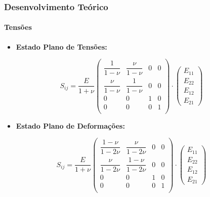 \documentclass{beamer}
\begin{document}
\begin{frame}
    \frametitle{Desenvolvimento Teórico}
    \framesubtitle{Tensões}
    \begin{itemize}
        \item \textbf{Estado Plano de Tensões:}
    \end{itemize}
    \begin{equation}
    S_{ij} = 
    \dfrac{E}{1+\nu}
    \begin{pmatrix}
        \dfrac{1}{1-\nu} & \dfrac{\nu}{1-\nu} & 0 & 0\\
        \dfrac{\nu}{1-\nu}& \dfrac{1}{1-\nu} & 0 & 0\\
         0 & 0 & 1 & 0 \\
         0 & 0 & 0 & 1 \\
    \end{pmatrix}
    \cdot
    \begin{pmatrix}
        E_{11} \\
        E_{22} \\
        E_{12}  \\
        E_{21}
    \end{pmatrix}
\end{equation}

\begin{itemize}
    \item \textbf{Estado Plano de Deformações:}
\end{itemize}
\begin{equation}
    S_{ij} = 
    \dfrac{E}{1+\nu}
    \begin{pmatrix}
        \dfrac{1-\nu}{1-2\nu} & \dfrac{\nu}{1-2\nu} & 0 & 0\\
        \dfrac{\nu}{1-2\nu} & \dfrac{1-\nu}{1-2\nu} & 0 & 0\\
         0 & 0 & 1 & 0 \\
         0 & 0 & 0 & 1 \\
    \end{pmatrix}
    \cdot
    \begin{pmatrix}
        E_{11} \\
        E_{22} \\
        E_{12}  \\
        E_{21}
    \end{pmatrix}
\end{equation}
\end{frame}
\end{document}
